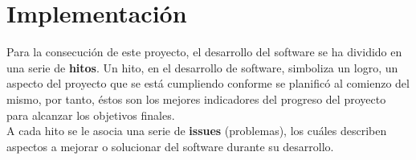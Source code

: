 \chapter{Implementación}

Para la consecución de este proyecto, el desarrollo del software se ha dividido en una serie
de \textbf{hitos}. Un hito, en el desarrollo de software, simboliza un logro, un aspecto
del proyecto que se está cumpliendo conforme se planificó al comienzo del mismo, por tanto, 
éstos son los mejores indicadores del progreso del proyecto para alcanzar los objetivos
finales.\\

A cada hito se le asocia una serie de \textbf{issues} (problemas), los cuáles describen
aspectos a mejorar o solucionar del software durante su desarrollo. \\

